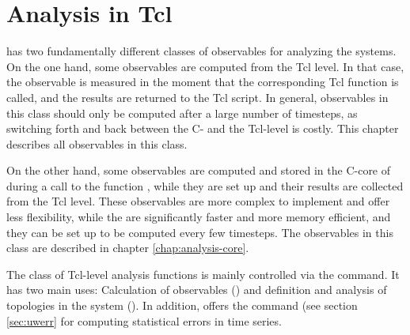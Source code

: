 %  
%   
%  
%  
%
\chapter{Analysis in Tcl}
\label{chap:analysis}


\es has two fundamentally different classes of observables for
analyzing the systems.  On the one hand, some observables are
computed from the Tcl level. In that case, the observable is measured
in the moment that the corresponding Tcl function is called, and the
results are returned to the Tcl script. In general, observables in
this class should only be computed after a large number of timesteps,
as switching forth and back between the C- and the Tcl-level is
costly. This chapter describes all observables in this class.

On the other hand, some observables are computed and stored in the
C-core of \es during a call to the function , while
they are set up and their results are collected from the Tcl level.
These observables are more complex to implement and offer less
flexibility, while the are significantly faster and more memory
efficient, and they can be set up to be computed every few
timesteps. The observables in this class are described in chapter
\ref{chap:analysis-core}.

The class of Tcl-level analysis functions is mainly controlled via the
 command. It has two main uses: Calculation of
observables () and definition and
analysis of topologies in the system ().  In addition, \es offers the command 
(see section \ref{sec:uwerr} for computing statistical errors in time
series.

